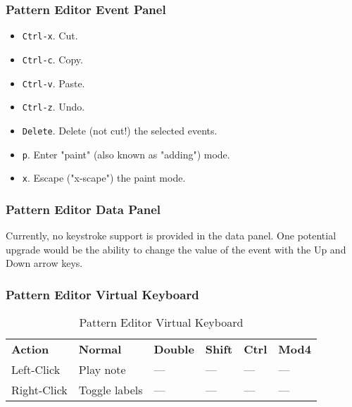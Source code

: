 \subsubsection{Pattern Editor Event Panel}
\label{subsubsec:kbd_mouse_pattern_editor_event_panel}

   \begin{itemize}
      \item \texttt{Ctrl-x}. Cut.
      \item \texttt{Ctrl-c}. Copy.
      \item \texttt{Ctrl-v}. Paste.
      \item \texttt{Ctrl-z}. Undo.
      \item \texttt{Delete}.  Delete (not cut!) the selected events.
      \item \texttt{p}.  Enter "paint" (also known as "adding") mode.
      \item \texttt{x}.  Escape ("x-scape") the paint mode.
   \end{itemize}

\subsubsection{Pattern Editor Data Panel}
\label{subsubsec:kbd_mouse_pattern_editor_data_panel}

   Currently, no keystroke support is provided in the data panel.
   One potential upgrade would be the ability to change the value of the event
   with the Up and Down arrow keys.

\subsubsection{Pattern Editor Virtual Keyboard}
\label{subsubsec:kbd_mouse_pattern_editor_virtual_keyboard}

   \begin{table}[H]
      \centering
      \caption{Pattern Editor Virtual Keyboard}
      \label{table:pattern_editor_virtual_keyboard}
      \begin{tabular}{l l l l l l}
         \textbf{Action}   & \textbf{Normal} & \textbf{Double}    & \textbf{Shift} & \textbf{Ctrl}   & \textbf{Mod4}      \\
         Left-Click        & Play note       & ---                & ---            & ---             & ---                \\
         Right-Click       & Toggle labels   & ---                & ---            & ---             & ---                \\
      \end{tabular}
   \end{table}


